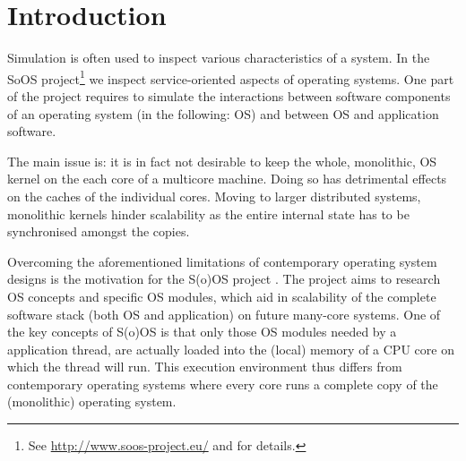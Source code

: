 \section{Introduction}

Simulation is often used to inspect various characteristics of a system.
In the SoOS project\footnote{See \url{http://www.soos-project.eu/} and \cite{soos} for details.} we inspect service-oriented aspects of operating systems.
One part of the project requires to simulate the interactions between software components of an operating system (in the following: OS) and between
OS and application software.

The main issue is: it is in fact not desirable to keep the whole, monolithic, OS kernel on the each core of a multicore machine.
Doing so has detrimental effects on the caches of the individual cores.
Moving to larger distributed systems, monolithic kernels hinder scalability as the entire internal state has to be synchronised amongst the copies.

Overcoming the aforementioned limitations of contemporary operating system designs is the motivation for the S(o)OS project \cite{soos}.
The project aims to research OS concepts and specific OS modules, which aid in scalability of the complete software stack (both OS and application) on future many-core systems.
One of the key concepts of S(o)OS is that only those OS modules needed by a application thread, are actually loaded into the (local) memory of a CPU core on which the thread will run.
This execution environment thus differs from contemporary operating systems where every core runs a complete copy of the (monolithic) operating system.

